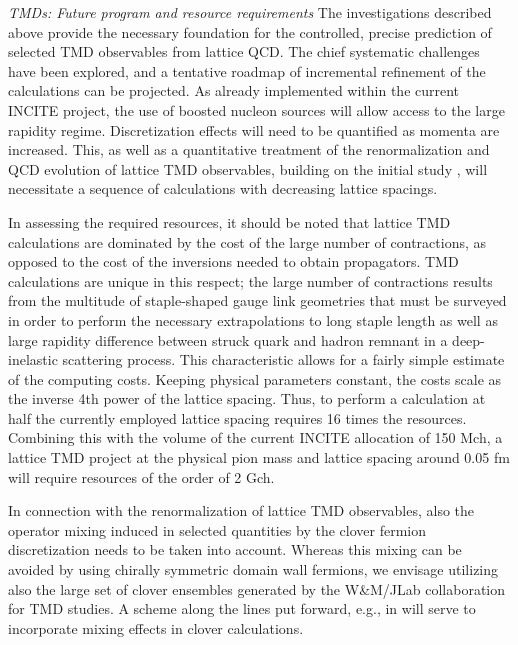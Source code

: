 {\it TMDs: Future program and resource requirements}
The investigations described above provide the necessary foundation for
the controlled, precise prediction of selected TMD observables from
lattice QCD. The chief systematic challenges have been explored,
and a tentative roadmap of incremental refinement of the calculations can
be projected. As already implemented within the current INCITE project,
the use of boosted nucleon sources will allow access to the large
rapidity regime. Discretization effects will need to be quantified
as momenta are increased. This, as well as a quantitative treatment
of the renormalization and QCD evolution of lattice TMD observables,
building on the initial study \cite{Yoon:2017qzo}, will necessitate a
sequence of calculations with decreasing lattice spacings.

In assessing the required resources, it should be noted that lattice
TMD calculations are dominated by the cost of the large number of
contractions, as opposed to the cost of the inversions needed to
obtain propagators. TMD calculations are unique in this respect;
the large number of contractions results from the multitude of
staple-shaped gauge link geometries that must be surveyed in order
to perform the necessary extrapolations to long staple length as
well as large rapidity difference between struck quark and hadron
remnant in a deep-inelastic scattering process. This characteristic
allows for a fairly simple estimate of the computing costs. Keeping
physical parameters constant, the costs scale as the inverse 4th power
of the lattice spacing. Thus, to perform a calculation at half the
currently employed lattice spacing requires 16 times the resources.
Combining this with the volume of the current INCITE allocation of
150 Mch, a lattice TMD project at the physical pion mass and lattice
spacing around 0.05 fm will require resources of the order of
2 Gch.

In connection with the renormalization of lattice TMD observables,
also the operator mixing induced in selected quantities by the clover
fermion discretization needs to be taken into account. Whereas this
mixing can be avoided by using chirally symmetric domain wall fermions,
we envisage utilizing also the large set of clover ensembles generated
by the W\&M/JLab collaboration for TMD studies. A scheme along the lines
put forward, e.g., in \cite{Green:2017xeu} will serve to incorporate mixing
effects in clover calculations.

